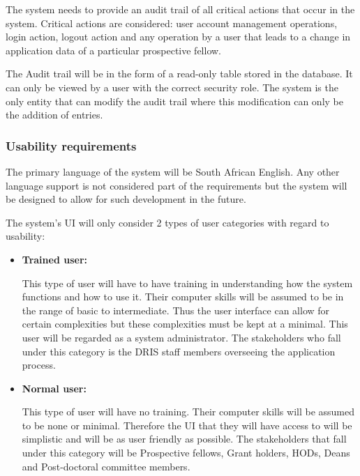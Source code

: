 \begin{flushleft}

The system needs to provide an audit trail of all critical actions that occur in the system. Critical actions are considered: user account management operations, login action, logout action and any operation by a user that leads to a change in application data of a particular prospective fellow.\\

\vspace{0.1in}

The Audit trail will be in the form of a read-only table stored in the database. It can only be viewed by a user with the correct security role. The system is the only entity that can modify the audit trail where this modification can only be the addition of entries.

\end{flushleft}
\vspace{0.1in}	

\subsubsection{Usability requirements}

\begin{flushleft}

The primary language of the system will be South African English. Any other language support is not considered part of the requirements but the system will be designed to allow for such development in the future.\\

\vspace{0.1in}

The system's UI will only consider 2 types of user categories with regard to usability:

\begin{itemize}

\item\textbf{Trained user:}

This type of user will have to have training in understanding how the system functions and how to use it. Their computer skills will be assumed to be in the range of basic to intermediate. Thus the user interface can allow for certain complexities but these complexities must be kept at a minimal. This user will be regarded as a system administrator. The stakeholders who fall under this category is the DRIS staff members overseeing the application process.

\item\textbf{Normal user:}

This type of user will have no training. Their computer skills will be assumed to be none or minimal. Therefore the UI that they will have access to will be simplistic and will be as user friendly as possible. The stakeholders that fall under this category will be Prospective fellows, Grant holders, HODs, Deans and Post-doctoral committee members.

\end{itemize}

\end{flushleft}


